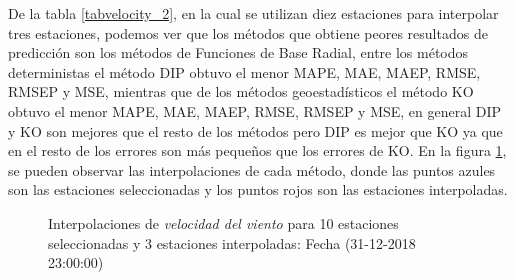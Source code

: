 De la tabla \ref{tabvelocity_2}, en la cual se utilizan diez estaciones para interpolar tres estaciones, podemos ver que los métodos que obtiene peores resultados de predicción son los métodos de Funciones de Base Radial, entre los métodos deterministas el método DIP obtuvo el menor MAPE, MAE, MAEP, RMSE, RMSEP y MSE, mientras que de los métodos geoestadísticos el método KO obtuvo el menor MAPE, MAE, MAEP, RMSE, RMSEP y MSE, en general DIP y KO son mejores que el resto de los métodos pero DIP es mejor que KO ya que en el resto de los errores son más pequeños que los errores de KO. En la figura \ref{velocityfigure2}, se pueden observar las interpolaciones de cada método, donde las puntos azules son las estaciones seleccionadas y los puntos rojos son las estaciones interpoladas.


\begin{figure}[H]
\centering
{}
\subfigure[KO] {\texttt{[image: ./ok\_10\_8\_26302]}}
\subfigure[KU] {\texttt{[image: ./uk\_10\_8\_26302]}}
\caption{Interpolaciones de  {\em velocidad del viento} para 10 estaciones seleccionadas y 3 estaciones interpoladas: Fecha (31-12-2018 23:00:00)}
\label{velocityfigure2}
\end{figure}


